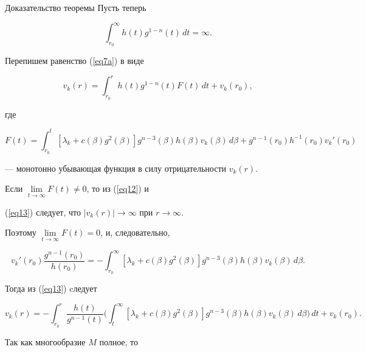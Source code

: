 \begin{pf*}{Доказательство теоремы}
Пусть теперь


\begin{equation}


\int_{r_0}^{\infty} h(t)g^{1-n}(t)\,dt=\infty.


\label{eq12}


\end{equation}


Перепишем равенство (\ref{eq7a}) в виде


\begin{equation}


v_k(r)=\int_{r_0}^r h(t)g^{1-n}(t)F(t)\,dt+v_k(r_0),


\label{eq13}


\end{equation}


где


$$


F(t)=\int_{r_0}^t


[\lambda_k+c(\beta)g^2(\beta)]g^{n-3}(\beta)h(\beta)


v_k(\beta)\,d\beta +g^{n-1}(r_0)h^{-1}(r_0)v_k'(r_0)


$$


--- монотонно убывающая функция в силу отрицательности $v_k(r)$.


Если $\lim\limits_{t\to\infty}F(t)\ne 0$, то из (\ref{eq12}) и


(\ref{eq13}) следует, что $|v_k(r)|\to\infty$ при $r\to\infty$.


Поэтому $\lim\limits_{t\to\infty}F(t)=0$, и, следовательно,


$$


v_k'(r_0)\frac{g^{n-1}(r_0)}{h(r_0)}=-\int_{r_0}^\infty


[\lambda_k+c(\beta)g^2(\beta)]g^{n-3}(\beta)h(\beta)


v_k(\beta)\,d\beta.


$$


Тогда из (\ref{eq13}) cледует


\begin{equation}


v_k(r)=-\int_{r_0}^r \frac{h(t)}{g^{n-1}(t)}\biggl(\int_{t}^\infty


[\lambda_k+c(\beta)g^2(\beta)]g^{n-3}(\beta)h(\beta)v_k(\beta)\,


d\beta\biggr)\,dt +v_k(r_0).


\label{eq14}


\end{equation}


Так как многообразие $M$ полное, то



\end{pf*}
